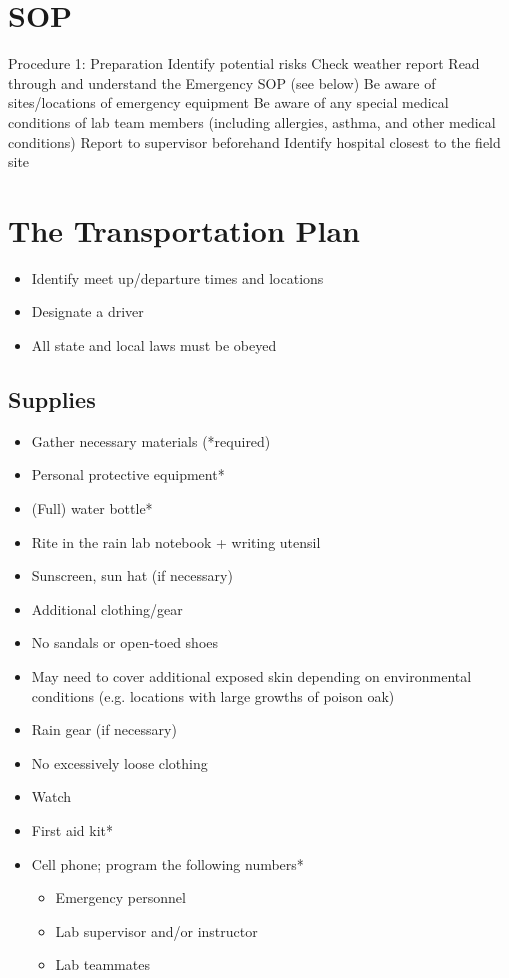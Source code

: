 \documentclass[12pt]{../SOP3_beta}
\begin{document}
\section{SOP}

Procedure 1: Preparation
Identify potential risks
Check weather report
Read through and understand the Emergency SOP (see below)
Be aware of sites/locations of emergency equipment
Be aware of any special medical conditions of lab team members (including allergies, asthma, and other medical conditions)
Report to supervisor beforehand
Identify hospital closest to the field site


\section{The Transportation Plan}

\begin{itemize}
  \item Identify meet up/departure times and locations
  \item Designate a driver
  \item All state and local laws must be obeyed
\end{itemize}

\subsection{Supplies}

\begin{itemize}
  \item Gather necessary materials (*required)
  \item Personal protective equipment*
  \item (Full) water bottle*
  \item Rite in the rain lab notebook + writing utensil
  \item Sunscreen, sun hat (if necessary)
  \item Additional clothing/gear
  \item No sandals or open-toed shoes
  \item May need to cover additional exposed skin depending on environmental conditions (e.g. locations with large growths of poison oak)
  \item Rain gear (if necessary)
  \item No excessively loose clothing
  \item Watch
  \item First aid kit*
  \item Cell phone; program the following numbers*
\begin{itemize}
  \item Emergency personnel
  \item Lab supervisor and/or instructor
  \item Lab teammates
\end{itemize}
\end{itemize}
\end{document}
